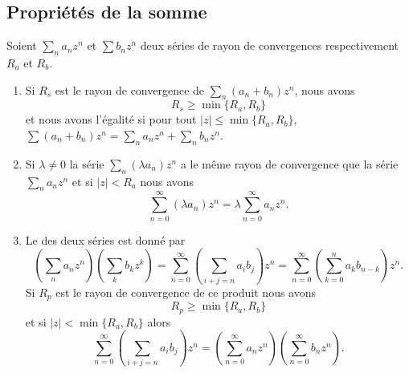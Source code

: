 \subsection{Propriétés de la somme}

\begin{theorem}     \label{ThokPTXYC}
    Soient \( \sum_na_nz^n\) et \( \sum b_nz^n\) deux séries de rayon de convergences respectivement \( R_a\) et \( R_b\).
    \begin{enumerate}
        \item   \label{IteWlajij}
            Si \( R_s\) est le rayon de convergence de \( \sum_n(a_n+b_n)z^n\), nous avons
            \begin{equation}
                R_s\geq \min\{ R_a,R_b \}
            \end{equation}
            et nous avons l'égalité si pour tout \( |z |\leq\min\{ R_a,R_b \}\), \( \sum (a_n+b_n)z^n=\sum_n a_nz^n+\sum_nb_nz^n\).
        \item
            Si \( \lambda\neq 0\) la série \( \sum_n(\lambda a_n)z^n\) a le même rayon de convergence que la série \( \sum_na_nz^n\) et si \( | z |<R_a\) nous avons
            \begin{equation}
                \sum_{n=0}^{\infty}(\lambda a_n)z^n=\lambda\sum_{n=0}^{\infty}a_nz^n.
            \end{equation}
        \item
            Le  des deux séries est donné par
            \begin{equation}        \label{EqFPGGooDQlXGe}
                \left( \sum_na_nz^n \right)\left( \sum_k b_kz^k \right)=       \sum_{n=0}^{\infty}\left( \sum_{i+j=n}a_ib_j \right)z^n=\sum_{n=0}^{\infty}\left( \sum_{k=0}^{n}a_kb_{n-k} \right)z^n.
            \end{equation}
            Si \( R_p\) est le rayon de convergence de ce produit nous avons
            \begin{equation}
                R_p\geq \min\{ R_a,R_b \}
            \end{equation}
            et si \( | z |<\min\{ R_a,R_b \}\) alors
            \begin{equation}
                \sum_{n=0}^{\infty}\left( \sum_{i+j=n}a_ib_j \right)z^n=\left( \sum_{n=0}^{\infty}a_nz^n \right)\left( \sum_{n=0}^{\infty}b_nz^n \right).
            \end{equation}
            
    \end{enumerate}
    
\end{theorem}

